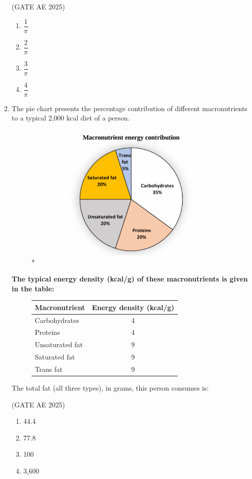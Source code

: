 \documentclass[journal,12pt,onecolumn]{IEEEtran}
\theoremstyle{remark}
\begin{document}
\begin{flushleft}
\begin{enumerate}
\hfill (GATE AE 2025)

\begin{enumerate}
    \item $\dfrac{1}{\pi}$
    \item $\dfrac{2}{\pi}$
    \item $\dfrac{3}{\pi}$ 
    \item $\dfrac{4}{\pi}$
\end{enumerate} 

\item The pie chart presents the percentage contribution of different macronutrients to a typical 2,000 kcal diet of a person.
\begin{figure}[H]
    
    \includegraphics[width=0.5\columnwidth]{figs/pie chart.png}
    \caption{*}
    \label{fig:placeholder}
\end{figure}

\textbf{The typical energy density (kcal/g) of these macronutrients is given in the table:}
\begin{figure}
\begin{tabular}{|l|c|}
\hline
\textbf{Macronutrient} & \textbf{Energy density (kcal/g)} \\
\hline
Carbohydrates & 4 \\
Proteins & 4 \\
Unsaturated fat & 9 \\
Saturated fat & 9 \\
Trans fat & 9 \\
\hline
\end{tabular}
\end{figure}

The total fat (all three types), in grams, this person consumes is: 

\hfill (GATE AE 2025)

    \begin{enumerate}
        \item 44.4
        \item 77.8
        \item 100
        \item 3,600
 \end{enumerate}


\end{enumerate}
\end{flushleft}
\end{document}

